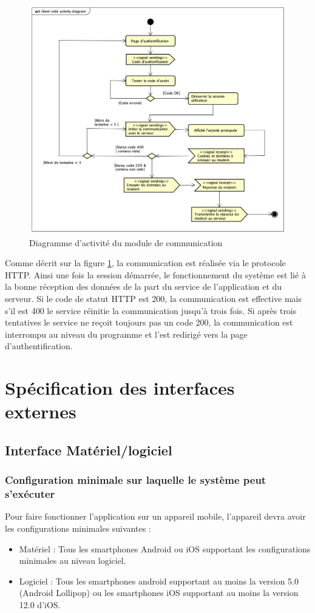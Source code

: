 \begin{figure}[H]
	\centering
	\includegraphics[scale=0.4]{assets/images/client_side_activity_diagram.png}
	\caption{Diagramme d'activité du module de communication}
	\label{fig.7}
\end{figure}
Comme décrit sur la figure \ref{fig.7}, la communication est réalisée via  le protocole \gls{HTTP}. Ainsi une fois la session démarrée, le fonctionnement du système est lié à la bonne réception des données de la part du service de l'application et du serveur. Si le code de statut \gls{HTTP} est 200, la communication est effective mais s'il est 400 le service réinitie la communication jusqu'à trois fois. Si après trois tentatives le service ne reçoit toujours pas un code 200, la communication est interrompu au niveau du programme et l'\ut est redirigé vers la page d'authentification.

\section{Spécification des interfaces externes}
\subsection{Interface Matériel/logiciel}
\subsubsection*{Configuration minimale sur laquelle le système peut s'exécuter}
Pour faire fonctionner l'application sur un appareil mobile, l'appareil devra avoir les configurations minimales suivantes :
\begin{itemize}
	\item Matériel : Tous les smartphones \gls{Android} ou \gls{iOS} supportant les configurations minimales au niveau logiciel.
	\item Logiciel : Tous les smartphones android supportant au moins la version 5.0 (Android Lollipop) ou les smartphones \gls{iOS} supportant au moins la version 12.0 d'\gls{iOS}.
\end{itemize}

